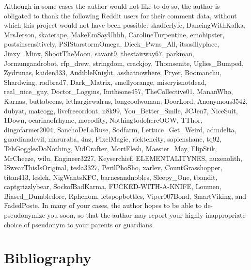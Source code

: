 \documentclass{article}
\begin{document}
Although in some cases the author would not like to do so, the author is obligated to thank the following Reddit users for their comment data, without which this project would not have been possible: skadferlyfe, DancingWithKafka, MrsJetson, skaterape, MakeEmSayUhhh, CarolineTurpentine, emohipster, postsinsensitively, PSIStarstormOmega, Dieck\_Pwns\_All, itsasillyplace, Jinxy\_Minx, ShootTheMoon, savant9, thestairway67, parkman, Jormungandrobot, rfp\_drew, stringdom, crackjoy, Thomsenite, Uglies\_Bumped, Zydrunas, kaiden333, AudibleKnight, asshatnowhere, Pryer, Boomanchu, Shardwing, radbrad7, Dark\_Matrix, smellyorange, miseryisnotdead, real\_nice\_guy, Doctor\_Loggins, Imtheone457, TheCollective01, MananWho, Karnas, buttabeens, lethargicwalrus, longcoolwoman, DoorLord, Anonymous3542, dubyat, mateogg, livefreeordont, n8k99, You\_Better\_Smile, JCJen7, NiceSuit, 1Down, ocarinaofrhyme, mocodity, NothingtodohereOGW, TThor, dingofarmer2004, SanchoDeLaRuse, Sodfarm, Lettuce\_Get\_Weird, admdelta, guardiandevil, maruraba, 4nz, PixelMagic, ricktencity, sapienshane, tq92, TehGogglesDoNothing, VidCrafter, MortFlesh, Maester\_May, FlipStik, MrCheeze, wilu, Engineer3227, Keyserchief, ELEMENTALITYNES, nuxenolith, ISwearThisIsOriginal, tesla3327, PerilPhoSho, xarlev, CountGrasshopper, titan413, lesleh, NigWantsKFC, barnesandnobles, Sleepy\_One, tbandit, captgrizzlybear, SockofBadKarma, FUCKED-WITH-A-KNIFE, Loumen, Biased\_Dumbledore, Rphenom, letspopbottles, Viper007Bond, SmartViking, and FadedPoste. In many of your cases, the author hopes to be able to de-pseudonymize you soon, so that the author may report your highly inappropriate choice of pseudonym to your parents or guardians.

\section{Bibliography}


\end{document}
